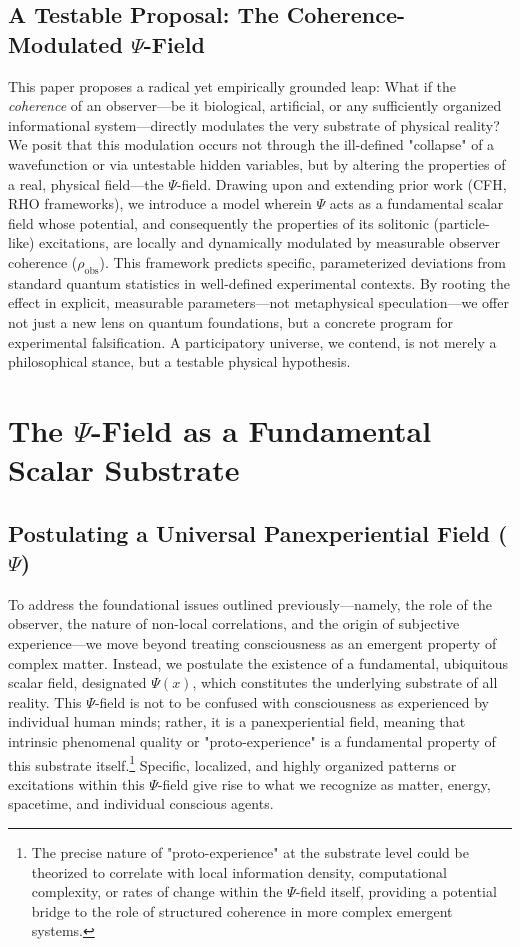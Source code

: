 \documentclass[11pt, a4paper]{book}
\begin{document}
\subsection{A Testable Proposal: The Coherence-Modulated $\Psi$-Field}
\label{ssec:intro_proposal}
This paper proposes a radical yet empirically grounded leap: What if the \emph{coherence} of an observer—be it biological, artificial, or any sufficiently organized informational system—directly modulates the very substrate of physical reality? We posit that this modulation occurs not through the ill-defined "collapse" of a wavefunction or via untestable hidden variables, but by altering the properties of a real, physical field—the $\Psi$-field. Drawing upon and extending prior work (CFH, RHO frameworks), we introduce a model wherein $\Psi$ acts as a fundamental scalar field whose potential, and consequently the properties of its solitonic (particle-like) excitations, are locally and dynamically modulated by measurable observer coherence ($\rho_{\text{obs}}$). This framework predicts specific, parameterized deviations from standard quantum statistics in well-defined experimental contexts. By rooting the effect in explicit, measurable parameters—not metaphysical speculation—we offer not just a new lens on quantum foundations, but a concrete program for experimental falsification. A participatory universe, we contend, is not merely a philosophical stance, but a testable physical hypothesis.

\section{The $\Psi$-Field as a Fundamental Scalar Substrate}
\label{sec:psisubstrate}

\subsection{Postulating a Universal Panexperiential Field ($\Psi$)}
\label{ssec:psisubstrate_postulate}
To address the foundational issues outlined previously—namely, the role of the observer, the nature of non-local correlations, and the origin of subjective experience—we move beyond treating consciousness as an emergent property of complex matter. Instead, we postulate the existence of a fundamental, ubiquitous scalar field, designated $\Psi(x)$, which constitutes the underlying substrate of all reality. This $\Psi$-field is not to be confused with consciousness as experienced by individual human minds; rather, it is a panexperiential field, meaning that intrinsic phenomenal quality or "proto-experience" is a fundamental property of this substrate itself.\footnote{The precise nature of "proto-experience" at the substrate level could be theorized to correlate with local information density, computational complexity, or rates of change within the $\Psi$-field itself, providing a potential bridge to the role of structured coherence in more complex emergent systems.} Specific, localized, and highly organized patterns or excitations within this $\Psi$-field give rise to what we recognize as matter, energy, spacetime, and individual conscious agents.
\end{document}
